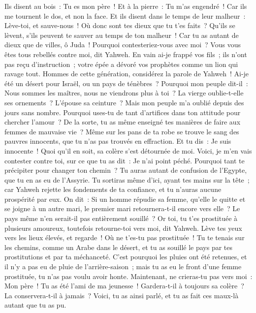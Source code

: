 \begin{multicols}{2}
Ils disent au bois~: Tu es mon père~! Et à la pierre~: Tu m'as engendré~! Car ils me tournent le dos, et non la face. Et ils disent dans le temps de leur malheur~: Lève-toi, et sauve-nous~!
Où donc sont tes dieux que tu t'es faits~? Qu'ils se lèvent, s'ils peuvent te sauver au temps de ton malheur~! Car tu as autant de dieux que de villes, ô Juda~!
Pourquoi contesteriez-vous avec moi~? Vous vous êtes tous rebellés contre moi, dit Yahweh.
En vain ai-je frappé vos fils~; ils n'ont pas reçu d'instruction~; votre épée a dévoré vos prophètes comme un lion qui ravage tout.
Hommes de cette génération, considérez la parole de Yahweh~! Ai-je été un désert pour Israël, ou un pays de ténèbres~? Pourquoi mon peuple dit-il~: Nous sommes les maîtres, nous ne viendrons plus à toi~?
La vierge oublie-t-elle ses ornements~? L'épouse sa ceinture~? Mais mon peuple m'a oublié depuis des jours sans nombre.
Pourquoi uses-tu de tant d'artifices dans ton attitude pour chercher l'amour~? De la sorte, tu as même enseigné tes manières de faire aux femmes de mauvaise vie~?
Même sur les pans de ta robe se trouve le sang des pauvres innocents, que tu n'as pas trouvés en effraction.
Et tu dis~: Je suis innocente~! Quoi qu'il en soit, sa colère s'est détournée de moi. Voici, je m'en vais contester contre toi, sur ce que tu as dit~: Je n'ai point péché.
Pourquoi tant te précipiter pour changer ton chemin~? Tu auras autant de confusion de l'Egypte, que tu en as eu de l'Assyrie.
Tu sortiras même d'ici, ayant tes mains sur la tête~; car Yahweh rejette les fondements de ta confiance, et tu n'auras aucune prospérité par eux.
\VerseOne{}On dit~: Si un homme répudie sa femme, qu'elle le quitte et se joigne à un autre mari, le premier mari retournera-t-il encore vers elle~? Le pays même n'en serait-il pas entièrement souillé~? Or toi, tu t'es prostituée à plusieurs amoureux, toutefois retourne-toi vers moi, dit Yahweh.
Lève tes yeux vers les lieux élevés, et regarde~! Où ne t'es-tu pas prostituée~! Tu te tenais sur les chemins, comme un Arabe dans le désert, et tu as souillé le pays par tes prostitutions et par ta méchanceté.
C'est pourquoi les pluies ont été retenues, et il n'y a pas eu de pluie de l'arrière-saison~; mais tu as eu le front d'une femme prostituée, tu n'as pas voulu avoir honte.
Maintenant, ne crieras-tu pas vers moi~: Mon père~! Tu as été l'ami de ma jeunesse~!
Gardera-t-il à toujours sa colère~? La conservera-t-il à jamais~? Voici, tu as ainsi parlé, et tu as fait ces maux-là autant que tu as pu.

\end{multicols}
